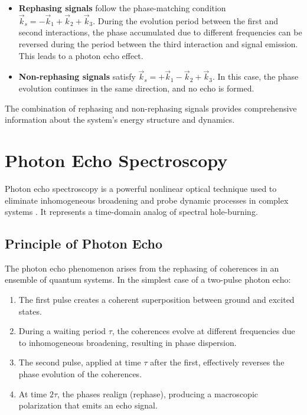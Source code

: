 \begin{itemize}
    \item \textbf{Rephasing signals} follow the phase-matching condition $\vec{k}_s = -\vec{k}_1 + \vec{k}_2 + \vec{k}_3$. During the evolution period between the first and second interactions, the phase accumulated due to different frequencies can be reversed during the period between the third interaction and signal emission. This leads to a photon echo effect.

    \item \textbf{Non-rephasing signals} satisfy $\vec{k}_s = +\vec{k}_1 - \vec{k}_2 + \vec{k}_3$. In this case, the phase evolution continues in the same direction, and no echo is formed.
\end{itemize}

\noindent The combination of rephasing and non-rephasing signals provides comprehensive information about the system's energy structure and dynamics.


\section{Photon Echo Spectroscopy}
\label{sec:photon_echo}

\noindent Photon echo spectroscopy is a powerful nonlinear optical technique used to eliminate inhomogeneous broadening and probe dynamic processes in complex systems \cite{Hybl1998, Mukamel1995}. It represents a time-domain analog of spectral hole-burning.

\subsection{Principle of Photon Echo}
\label{subsec:echo_principle}

\noindent The photon echo phenomenon arises from the rephasing of coherences in an ensemble of quantum systems. In the simplest case of a two-pulse photon echo:

\begin{enumerate}
    \item The first pulse creates a coherent superposition between ground and excited states.
    \item During a waiting period $\tau$, the coherences evolve at different frequencies due to inhomogeneous broadening, resulting in phase dispersion.
    \item The second pulse, applied at time $\tau$ after the first, effectively reverses the phase evolution of the coherences.
    \item At time $2\tau$, the phases realign (rephase), producing a macroscopic polarization that emits an echo signal.
\end{enumerate}

